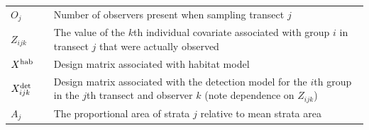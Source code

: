 \documentclass[10pt]{article}
\begin{document}
\begin{table}
\begin{tabular}{p{1.5cm}l p{12.5cm}}
$O_j$   & & Number of observers present when sampling transect $j$ \\
$Z_{ijk}$   & &  The value of the $k$th individual covariate associated with group
                $i$ in transect $j$ that were actually observed\\
$X^{\rm hab}$   & &  Design matrix associated with habitat model\\
$X^{\rm det}_{ijk}$   & &  Design matrix associated with the detection model for the $i$th group in the $j$th transect and observer $k$ (note dependence on $Z_{ijk}$) \\
$A_j$   & & The proportional area of strata $j$ relative to mean strata area\\
\hline
\end{tabular}
\begin{flushleft}
\end{flushleft}
\label{tab:defs}
\end{table}

\end{document}
